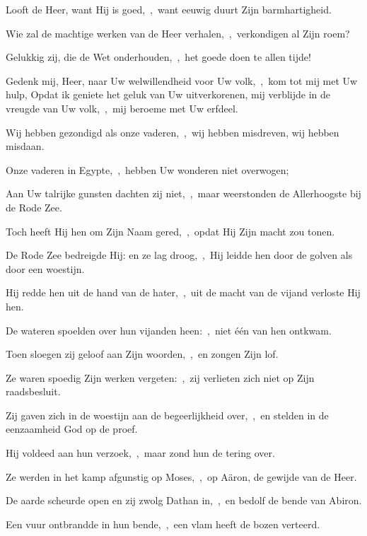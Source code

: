 \documentclass[12pt,twoside,a5paper]{article}
\begin{document}
\begin{halfparskip}

   Looft de Heer, want Hij is goed,~\sep\ want eeuwig duurt Zijn barmhartigheid.


  Wie zal de machtige werken van de Heer verhalen,~\sep\ verkondigen al Zijn roem?

  Gelukkig zij, die de Wet onderhouden,~\sep\ het goede doen te allen tijde!

  Gedenk mij, Heer, naar Uw welwillendheid voor Uw volk,~\sep\ kom tot mij met Uw hulp,
  Opdat ik geniete het geluk van Uw uitverkorenen, mij verblijde in de vreugde van Uw volk,~\sep\ mij beroeme met Uw erfdeel.

  Wij hebben gezondigd als onze vaderen,~\sep\ wij hebben misdreven, wij hebben misdaan.

  Onze vaderen in Egypte,~\sep\ hebben Uw wonderen niet overwogen;

  Aan Uw talrijke gunsten dachten zij niet,~\sep\ maar weerstonden de Allerhoogste bij de Rode Zee.

  Toch heeft Hij hen om Zijn Naam gered,~\sep\ opdat Hij Zijn macht zou tonen.

  De Rode Zee bedreigde Hij: en ze lag droog,~\sep\ Hij leidde hen door de golven als door een woestijn.

  Hij redde hen uit de hand van de hater,~\sep\ uit de macht van de vijand verloste Hij hen.

  De wateren spoelden over hun vijanden heen:~\sep\ niet één van hen ontkwam.

  Toen sloegen zij geloof aan Zijn woorden,~\sep\ en zongen Zijn lof.

  Ze waren spoedig Zijn werken vergeten:~\sep\ zij verlieten zich niet op Zijn raadsbesluit.

  Zij gaven zich in de woestijn aan de begeerlijkheid over,~\sep\ en stelden in de eenzaamheid God op de proef.

  Hij voldeed aan hun verzoek,~\sep\ maar zond hun de tering over.

  Ze werden in het kamp afgunstig op Moses,~\sep\ op Aäron, de gewijde van de Heer.

  De aarde scheurde open en zij zwolg Dathan in,~\sep\ en bedolf de bende van Abiron.

  Een vuur ontbrandde in hun bende,~\sep\ een vlam heeft de bozen verteerd.


\end{halfparskip}
\end{document}
